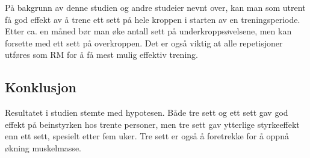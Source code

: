 \documentclass[
]{book}
\begin{document}
På bakgrunn av denne studien og andre studeier nevnt over, kan man som utrent få god effekt av å trene ett sett på hele kroppen i starten av en treningsperiode. Etter ca. en måned bør man øke antall sett på underkroppsøvelsene, men kan forsette med ett sett på overkroppen. Det er også viktig at alle repetisjoner utføres som RM for å få mest mulig effektiv trening.

\hypertarget{konklusjon}{%
\subsection{Konklusjon}\label{konklusjon}}

Resultatet i studien stemte med hypotesen. Både tre sett og ett sett gav god effekt på beinstyrken hos trente personer, men tre sett gav ytterlige styrkeeffekt enn ett sett, spesielt etter fem uker. Tre sett er også å foretrekke for å oppnå økning muskelmasse.

  
\end{document}
